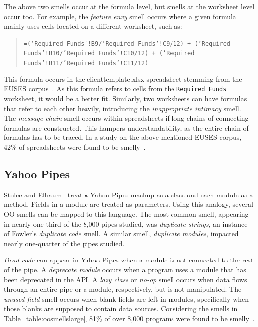 \documentclass{sig-alternate}
\begin{document}
The above two smells occur at the formula level, but smells at the worksheet level occur too. For example, the \emph{feature envy} smell occurs where a given formula mainly uses cells located on a different worksheet, such as: \begin{quote} \begin{small}{\tt =('Required Funds'!B9/'Required Funds'!C9/12) + ('Required Funds'!B10/'Required Funds'!C10/12) + ('Required Funds'!B11/'Required Funds'!C11/12)} \end{small}\end{quote} This formula occurs in the clienttemplate.xlsx spreadsheet stemming from the EUSES corpus~\cite{fisher2005euses}. As this formula refers to cells from the {\tt Required Funds} worksheet, it would be a better fit. Similarly, two worksheets can have formulas that refer to each other heavily, introducing the \emph{inappropriate intimacy} smell. The \emph{message chain} smell occurs within spreadsheets if long chains of connecting formulas are constructed. This hampers understandability, as the entire chain of formulas has to be traced. In a study on the above mentioned EUSES corpus, 42\% of spreadsheets were found to be smelly~\cite{Hermans2012intra}.

\subsection{Yahoo Pipes}
Stolee and Elbaum~\cite{Stolee2011, StoleeTSE2013} treat a Yahoo Pipes mashup as a class and each module as a method.  Fields in a module are treated as parameters. Using this analogy,  several OO smells can be mapped to this language. The most common smell, appearing in nearly one-third of the 8,000 pipes studied, was \emph{duplicate strings}, an instance of Fowler's \emph{duplicate code} smell. 
A similar smell, \emph{duplicate modules}, impacted nearly one-quarter of the pipes studied. 
 
\emph{Dead code} can appear in Yahoo Pipes when a module is not connected to the rest of the pipe. A  \emph{deprecate module} occurs when a program uses a module that has been deprecated in the API. A \emph{lazy class} or \emph{no-op} smell occurs when data flows through an entire pipe or a module, respectively, but is not manipulated. The \emph{unused field} smell occurs when blank fields are left in modules, specifically when those blanks are supposed to contain data sources. Considering the smells in Table~\ref{table:oosmellslarge}, 81\% of over 8,000 programs were found to be smelly~\cite{Stolee2011,StoleeTSE2013}.
\end{document}
